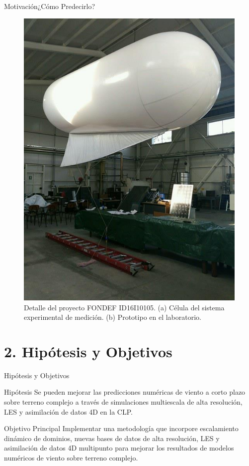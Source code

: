 \documentclass[mathserif,10pt]{beamer}
\begin{document}
\begin{frame}{Motivación}{¿Cómo Predecirlo?}
\begin{figure}
\begin{minipage}{0.5\linewidth}
			\includegraphics[width=0.7\linewidth,trim={0cm 0cm 0cm 0cm},clip]{fig/01/prototipo}
		\end{minipage}%
		\caption{Detalle del proyecto FONDEF ID16I10105. (a) Célula del sistema experimental de medición. (b) Prototipo en el laboratorio.}
		\label{fig:01_detalle_fondef}
	\end{figure}
\end{frame}

\section{2. Hipótesis y Objetivos}
\begin{frame}{Hipótesis y Objetivos}
	\begin{block}{Hipótesis}\justifying
		Se pueden mejorar las predicciones numéricas de viento a corto plazo sobre terreno complejo a través de simulaciones multiescala de alta resolución, LES y asimilación de datos 4D en la CLP.
	\end{block}
	\begin{block}{Objetivo Principal}\justifying
		Implementar una metodología que incorpore escalamiento dinámico de dominios, nuevas bases de datos de alta resolución, LES y asimilación de datos 4D multipunto para mejorar los resultados de modelos numéricos de viento sobre terreno complejo.
	\end{block}
\end{frame}
\end{document}
